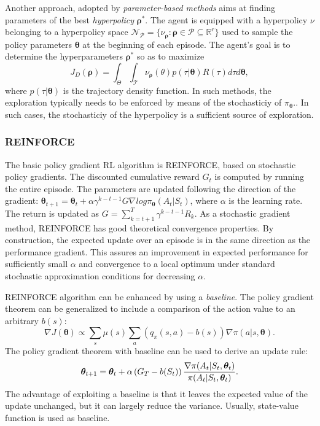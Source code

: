 Another approach, adopted by \textit{parameter-based methods} aims at finding parameters of the best \textit{hyperpolicy} $\boldsymbol \rho^*$. The agent is equipped with a hyperpolicy $\nu$ belonging to a hyperpolicy space \(\mathcal{N}_{\mathcal{P}} = \{\nu_{\boldsymbol \rho}:\boldsymbol \rho \in \mathcal{P} \subseteq \mathbb{R}^r\}\) used to sample the policy parameters $\boldsymbol \theta$ at the beginning of each episode. The agent's goal is to determine the hyperparameters \(\boldsymbol \rho^*\) so as to maximize \begin{equation} J_D( \boldsymbol \rho) = \int_{\Theta} \int_{\mathcal{T}} \nu_{\boldsymbol \rho}( \theta)p(\tau| \boldsymbol \theta)R(\tau)d\tau d \boldsymbol \theta, \end{equation} where $p(\tau|\boldsymbol \theta)$ is the trajectory density function. In such methods, the exploration typically needs to be enforced by means of the stochasticiy of $\pi_{\boldsymbol \theta}$.. In such cases, the stochasticiy of the hyperpolicy is a sufficient source of exploration.


\subsubsection{REINFORCE}
The basic policy gradient RL algorithm is REINFORCE, based on stochastic policy gradients. The discounted cumulative reward $G_t$ is computed  by running the entire episode. The parameters are updated following the direction of the gradient: \( \boldsymbol \theta_{t+1} = \boldsymbol \theta_t + \alpha \gamma^{k-t-1} G \nabla log \pi_{\boldsymbol \theta}(A_t|S_t)\), where $\alpha$ is the learning rate. The return is updated as \(G=\sum^{T}_{k=t+1}\gamma^{k-t-1}R_k.\) 
As a stochastic gradient method, REINFORCE has good theoretical convergence properties. By construction, the expected update over an episode is in the same direction as the performance gradient. This assures an improvement in expected performance for sufficiently small $\alpha$ and convergence to a local optimum under standard stochastic approximation conditions for decreasing $\alpha$.

REINFORCE algorithm can be enhanced by using a \textit{baseline}. The policy gradient theorem can be generalized to include a comparison of the action value to an arbitrary $b(s)$:
\begin{equation}\nabla J (\boldsymbol  \theta) \propto \sum_s \mu(s) \sum_a (q_\pi(s,a)-b(s))\nabla \pi(a|s,\boldsymbol \theta).\end{equation}
The policy gradient theorem with baseline can be used to derive an update rule: 
\begin{equation}\boldsymbol \theta_{t+1}=\boldsymbol \theta_t + \alpha \left( G_T - b(S_t)\boldsymbol \right)\frac{\nabla \pi(A_t|S_t,\boldsymbol \theta_t)}{\pi(A_t|S_t, \boldsymbol \theta_t)}.\end{equation}
The advantage of exploiting a baseline is that it leaves the expected value of the update unchanged, but it can largely reduce the variance. Usually, state-value function is used as baseline.

